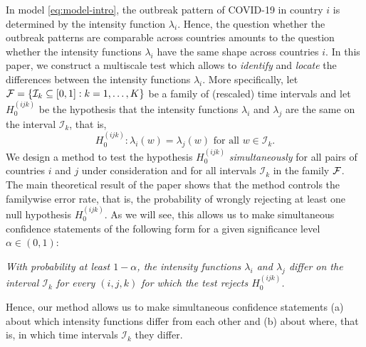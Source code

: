 \documentclass[a4paper,12pt]{article}
\numberwithin{equation}{section}
\begin{document}
In model \eqref{eq:model-intro}, the outbreak pattern of COVID-19 in country $i$ is determined by the intensity function $\lambda_i$. Hence, the question whether the outbreak patterns are comparable across countries amounts to the question whether the intensity functions $\lambda_i$ have the same shape across countries $i$. 
In this paper, we construct a multiscale test which allows to \textit{identify} and \textit{locate} the differences between the intensity functions $\lambda_i$. More specifically, let $\mathcal{F} = \{ \mathcal{I}_k \subseteq[0,1] : k = 1,\ldots,K \}$ be a family of (rescaled) time intervals and let $H_0^{(ijk)}$ be the hypothesis that the intensity functions $\lambda_i$ and $\lambda_j$ are the same on the interval $\mathcal{I}_k$, that is, 
\[ H_0^{(ijk)}: \lambda_i(w) = \lambda_j(w) \text{ for all } w \in \mathcal{I}_k. \]
We design a method to test the hypothesis $H_0^{(ijk)}$ \textit{simultaneously} for all pairs of countries $i$ and $j$ under consideration and for all intervals $\mathcal{I}_k$ in the family $\mathcal{F}$. The main theoretical result of the paper shows that the method controls the familywise error rate, that is, the probability of wrongly rejecting at least one null hypothesis $H_0^{(ijk)}$. As we will see, this allows us to make simultaneous confidence statements of the following form for a given significance level $\alpha \in (0,1)$: 
\begin{center}
\begin{minipage}[c][1.25cm][c]{13cm}
\textit{With probability at least $1-\alpha$, the intensity functions $\lambda_i$ and $\lambda_j$ differ on the interval $\mathcal{I}_k$ for every $(i,j,k)$ for which the test rejects $H_0^{(ijk)}$.} 
\end{minipage}
\end{center}
Hence, our method allows us to make simultaneous confidence statements (a) about which intensity functions differ from each other and (b) about where, that is, in which time intervals $\mathcal{I}_{k}$ they differ. 
\end{document}
